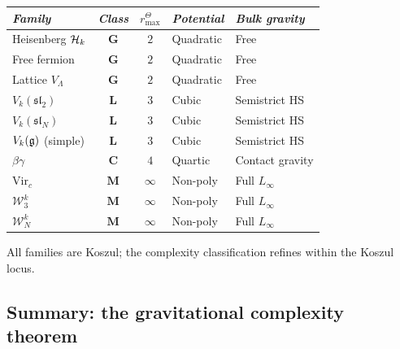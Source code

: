 \begin{theorem}
\ClaimStatusProvedHere
{}
\begin{center}
\small
\renewcommand{\arraystretch}{1.3}
\begin{tabular}{l@{\quad}c@{\quad}c@{\quad}l@{\quad}l}
\toprule
\emph{Family} & \emph{Class} & \(r^\Theta_{\max}\) &
 \emph{Potential} &
 \emph{Bulk gravity} \\
\midrule
Heisenberg $\mathcal{H}_k$ &
 $\mathbf{G}$ & $2$ & Quadratic & Free \\
Free fermion &
 $\mathbf{G}$ & $2$ & Quadratic & Free \\
Lattice $V_\Lambda$ &
 $\mathbf{G}$ & $2$ & Quadratic & Free \\[3pt]
$V_k(\mathfrak{sl}_2)$ &
 $\mathbf{L}$ & $3$ & Cubic & Semistrict HS \\
$V_k(\mathfrak{sl}_N)$ &
 $\mathbf{L}$ & $3$ & Cubic & Semistrict HS \\
$V_k(\mathfrak{g})$ (simple) &
 $\mathbf{L}$ & $3$ & Cubic & Semistrict HS \\[3pt]
$\beta\gamma$ &
 $\mathbf{C}$ & $4$ & Quartic & Contact gravity \\[3pt]
$\mathrm{Vir}_c$ &
 $\mathbf{M}$ & $\infty$ & Non-poly & Full $L_\infty$ \\
$\mathcal{W}_3^k$ &
 $\mathbf{M}$ & $\infty$ & Non-poly & Full $L_\infty$ \\
$\mathcal{W}_N^k$ &
 $\mathbf{M}$ & $\infty$ & Non-poly & Full $L_\infty$ \\
\bottomrule
\end{tabular}
\end{center}
All families are Koszul; the complexity classification refines
within the Koszul locus.
\end{theorem}



\subsection{Summary: the gravitational complexity theorem}

